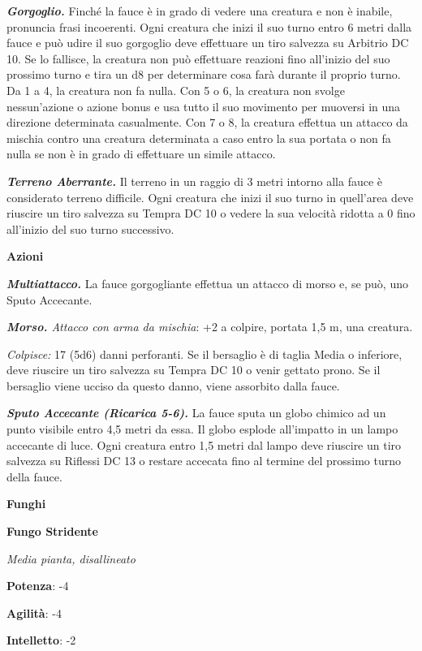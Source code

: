 \begin{multicols}{2}
\emph{\textbf{Gorgoglio.}} Finché la fauce è in grado di vedere una
creatura e non è inabile, pronuncia frasi incoerenti. Ogni creatura che
inizi il suo turno entro 6 metri dalla fauce e può udire il suo
gorgoglio deve effettuare un tiro salvezza su Arbitrio DC 10. Se lo
fallisce, la creatura non può effettuare reazioni fino all'inizio del
suo prossimo turno e tira un d8 per determinare cosa farà durante il
proprio turno. Da 1 a 4, la creatura non fa nulla. Con 5 o 6, la
creatura non svolge nessun'azione o azione bonus e usa tutto il suo
movimento per muoversi in una direzione determinata casualmente. Con 7 o
8, la creatura effettua un attacco da mischia contro una creatura
determinata a caso entro la sua portata o non fa nulla se non è in grado
di effettuare un simile attacco.

\emph{\textbf{Terreno Aberrante.}} Il terreno in un raggio di 3 metri
intorno alla fauce è considerato terreno difficile. Ogni creatura che
inizi il suo turno in quell'area deve riuscire un tiro salvezza su Tempra
DC 10 o vedere la sua velocità ridotta a 0 fino all'inizio del suo turno
successivo.

\textbf{Azioni}

\emph{\textbf{Multiattacco.}} La fauce gorgogliante effettua un attacco
di morso e, se può, uno Sputo Accecante.

\emph{\textbf{Morso.} Attacco con arma da mischia}: +2 a colpire,
portata 1,5 m, una creatura.

\emph{Colpisce:} 17 (5d6) danni perforanti. Se il bersaglio è di taglia
Media o inferiore, deve riuscire un tiro salvezza su Tempra DC 10 o venir
gettato prono. Se il bersaglio viene ucciso da questo danno, viene
assorbito dalla fauce.

\emph{\textbf{Sputo Accecante (Ricarica 5-6).}} La fauce sputa un globo
chimico ad un punto visibile entro 4,5 metri da essa. Il globo esplode
all'impatto in un lampo accecante di luce. Ogni creatura entro 1,5 metri
dal lampo deve riuscire un tiro salvezza su Riflessi DC 13 o restare
accecata fino al termine del prossimo turno della fauce.



\textbf{Funghi}

\textbf{Fungo Stridente}

\emph{Media pianta, disallineato}

\textbf{Potenza}: -4

\textbf{Agilità}: -4

\textbf{Intelletto}: -2


\end{multicols}
